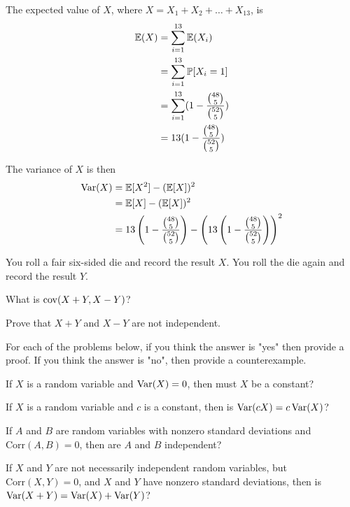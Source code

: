 \documentclass[11pt]{article}
\begin{document}
\begin{solution}
	
\begin{Parts}
		
\Part The expected value of $X$, where $X = X_1 + X_2 + \dots + X_13$, is 
\[
	\begin{split}
		\operatorname{\mathbb{E}}(X) &= \sum_{i=1}^{13} \operatorname{\mathbb{E}}(X_i) \\
		&= \sum_{i=1}^{13} \operatorname{\mathbb{P}}[X_i = 1] \\
		&= \sum_{i=1}^{13} (1 - \frac{\binom{48}{5}}{\binom{52}{5}}) \\
		&= 13 (1 - \frac{\binom{48}{5}}{\binom{52}{5}})
	\end{split}
\]

\Part The variance of $X$ is then 
\[
	\begin{split}
		\operatorname{Var}(X) &= \operatorname{\mathbb{E}}[X^2] - (\operatorname{\mathbb{E}}[X])^2 \\
		&= \operatorname{\mathbb{E}}[X] - (\operatorname{\mathbb{E}}[X])^2 \\
		&= 13 \left( 1 - \frac{\binom{48}{5}}{\binom{52}{5}} \right) - \left(13 \left(1 - \frac{\binom{48}{5}}{\binom{52}{5}}\right) \right)^2 
	\end{split}
\]
	
\end{Parts}
	
\end{solution}	


\begin{Parts}
	\Part You roll a fair six-sided die and record the result $X$. You roll the die again and record the result $Y$.  
	\begin{Parts}
		\item What is $\operatorname{cov} (X+Y, X-Y)$?
		\item Prove that $X+Y$ and $X-Y$ are not independent.
	\end{Parts}

\end{Parts}

For each of the problems below, if you think the answer is "yes" then provide a proof. If you think the answer is "no", then provide a counterexample.

\begin{Parts}[resume]
	
	\Part If $X$ is a random variable and $\operatorname{Var} (X) = 0$, then must $X$ be a constant?
	

	\Part If $X$ is a random variable and $c$ is a constant, then is $\operatorname{Var} (cX) = c \operatorname{Var} (X)$?
	

	\Part If $A$ and $B$ are random variables with nonzero standard deviations and $\text{Corr} (A, B) = 0$, then are $A$ and $B$ independent?
	

	\Part If $X$ and $Y$ are not necessarily independent random variables, but $\text{Corr} (X, Y) = 0$, and $X$ and $Y$ have nonzero standard deviations, then is $\operatorname{Var} (X+Y) = \operatorname{Var}(X) + \operatorname{Var}(Y)$?
	
\end{Parts}
	
\end{document}
